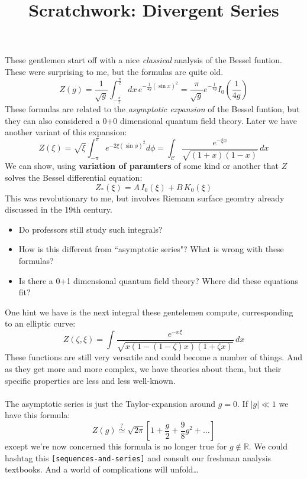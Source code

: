 \documentclass[12pt]{article}
\title{Scratchwork: Divergent Series}
\date{}
\begin{document}

\sffamily

\maketitle

\noindent These gentlemen start off with a nice \textit{classical} analysis of the Bessel funtion.  These were surprising to me, but the formulas are quite old.
$$ Z(g) = \frac{1}{\sqrt{g}} \int_{-\frac{\pi}{2}}^{\frac{\pi}{2}} dx \, e^{- \frac{1}{2g} (\sin x)^2} 
= \frac{\pi}{\sqrt{g}} e^{-\frac{1}{4g}} I_0(\frac{1}{4g})$$
These formulas are related to the \textit{asymptotic expansion} of the Bessel funtion, but they can also considered a 0+0 dimensional quantum field theory. Later we have another variant of this expansion:
$$ Z(\xi) = \sqrt{\xi} \int_{-\pi}^{\pi}e^{-2\xi (\sin \phi)^2} d\phi 
= \int_{\mathcal{C}} \frac{e^{-\xi x}}{\sqrt{(1+x)(1-x)}}\, dx$$
We can show, using \textbf{variation of paramters} of some kind or another that $Z$ solves the Bessel differential equation:
$$ Z_*(\xi) = A \, I_0(\xi) + B \, K_0 (\xi)$$
This was revolutionary to me, but involves Riemann surface geomtry already discussed in the 19th century.  
\begin{itemize}
\item Do professors still study such integrals?
\item How is this different from ``asymptotic series"?  What is wrong with these formulas?
\item Is there a 0+1 dimensional quantum field theory? Where did these equations fit?
\end{itemize}
One hint we have is the next integral these gentelemen compute, curresponding to an elliptic curve:
$$ Z(\zeta, \xi) = \int \frac{e^{-x\xi}}{\sqrt{x(1 - (1 - \zeta)x)(1 + \zeta x)}} \, dx$$
These functions are still very versatile and could become a number of things.  And as they get more and more complex, we have theories about them, but their specific properties are less and less well-known. \\ \\
The asymptotic series is just the Taylor-expansion around $g = 0$.   If $|g| \ll 1$ we have this formula:
$$ Z(g) \stackrel{?}{\simeq} \sqrt{2\pi} \left[ 1 + \frac{g}{2} + \frac{9}{8}g^2 + \dots \right]$$
except we're now concerned this formula is no longer true for $g \notin \mathbb{R}$.  We could hashtag this \texttt{[sequences-and-series]} and consult our freshman analysis textbooks.  And a world of complications will unfold\dots
\end{document}
